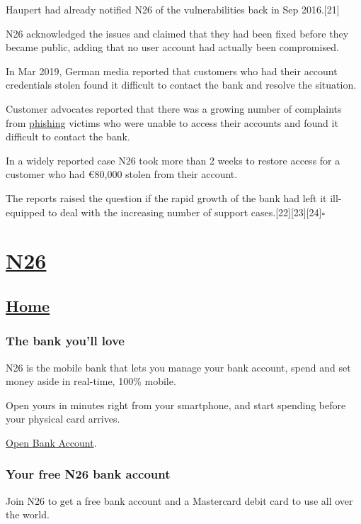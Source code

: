\documentclass[onsided]{book}
\numberwithin{equation}{section}
\begin{document}
Haupert had already notified N26 of the vulnerabilities back in Sep 2016.[21]

N26 acknowledged the issues and claimed that they had been fixed before they became public, adding that no user account had actually been compromised.

%
In Mar 2019, German media reported that customers who had their account credentials stolen found it difficult to contact the bank and resolve the situation.

Customer advocates reported that there was a growing number of complaints from \href{https://en.wikipedia.org/wiki/Phishing}{phishing} victims who were unable to access their accounts and found it difficult to contact the bank.

In a widely reported case N26 took more than 2 weeks to restore access for a customer who had €80,000 stolen from their account.

The reports raised the question if the rapid growth of the bank had left it ill-equipped to deal with the increasing number of support cases.[22][23][24]\hfill$\square$


\part{\href{https://n26.com/}{N26}}

\chapter{\href{https://n26.com/en-de}{Home}}

\section{The bank you'll love}
N26 is the mobile bank that lets you manage your bank account, spend and set money aside in real-time, 100\% mobile.

Open yours in minutes right from your smartphone, and start spending before your physical card arrives.

\href{https://get.n26.com/?ch=homepage3&_ga=2.115453510.1189510936.1611884241-1079622474.1611780638}{Open Bank Account}.

\section{Your free N26 bank account}
Join N26 to get a free bank account and a Mastercard debit card to use all over the world.
\end{document}
